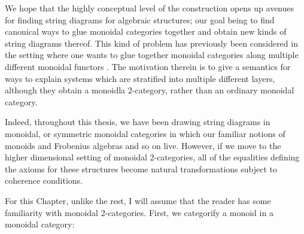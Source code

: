 We  hope that the highly conceptual level of the construction opens up avenues for finding string diagrams for algebraic structures; our goal being to find canonical ways to glue monoidal categories together and obtain new kinds of string diagrams thereof.  This kind of problem has previously been considered in the setting where one wants to glue together monoidal categories along multiple different monoidal functors \cite{lobski}.  The motivation therein is to give a semantics for ways to explain systems which are stratified into multiple different layers, although they obtain a monoidla 2-category, rather than an ordinary monoidal category.


Indeed, throughout this thesis, we have been drawing string diagrams in monoidal, or symmetric monoidal categories in which our familiar notions of monoids and Frobenius algebras and so on live.  However, if we move to the higher dimensional setting of monoidal 2-categories, all of the equalities defining the axioms for these structures become natural transformations subject to  coherence conditions.   


For this Chapter, unlike the rest, I will assume that the reader has some familiarity with monoidal 2-categories. First, we categorify a monoid in a monoidal category:

